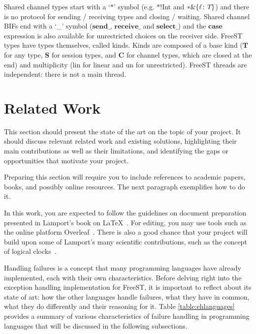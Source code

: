 \documentclass[sigplan]{acmart}
\newcommand{\un}{\text{un}}
\newcommand{\lin}{\text{lin}}
\newcommand{\mbf}[1]{\mathbf{#1}}
\newcommand{\send}{\mbf{send}}
\newcommand{\receive}{\mbf{receive}}
\newcommand{\select}{\mbf{select}}
\newcommand{\case}{\mbf{case}}
\newcommand{\Ckind}{\mbf{C}}
\newcommand{\Skind}{\mbf{S}}
\newcommand{\Tkind}{\mbf{T}}
\newcommand{\T}{\textit{\text{T}}}
\newcommand{\viewreceive}{\text{\&}}
\newcommand{\lbl}{\ell}
\begin{document}
Shared channel types start with a `$*$' symbol (e.g. $*$!Int and $*\viewreceive\{\lbl\!: \T\}$) and there is no protocol for sending / receiving types and closing / waiting.
Shared channel BIFs end with a `\_' symbol ($\send\_$, $\receive\_$ and $\select\_$) and the $\case$ expression is also available for unrestricted choices on the receiver side.
FreeST types have types themselves, called kinds.
Kinds are composed of a base kind ($\Tkind$ for any type, $\Skind$ for session types, and $\Ckind$ for channel types, which are closed at the end) and multiplicity ($\lin$ for linear and $\un$ for unrestricted).
FreeST threads are independent: there is not a main thread.

\section{Related Work} \label{sec:relatedwork}

\begin{template}
  This section should present the state of the art on the topic of your project. It should discuss relevant related work and existing solutions, highlighting their main contributions as well as their limitations, and identifying the gaps or opportunities that motivate your project.
  
  Preparing this section will require you to include references to academic papers, books, and possibly online resources. The next paragraph exemplifies how to do it.
  
  \medskip
  
  In this work, you are expected to follow the guidelines on document preparation presented in Lamport’s book on \LaTeX~\cite{lamport1994latex}. For editing, you may use tools such as the online platform Overleaf~\cite{overleaf}. There is also a good chance that your project will build upon some of Lamport’s many scientific contributions, such as the concept of logical clocks~\cite{lamport1978clocks}.
\end{template}

Handling failures is a concept that many programming languages have already implemented, each with their own characteristics.
Before delving right into the exception handling implementation for FreeST, it is important to reflect about its state of art: how the other languages handle failures, what they have in common, what they do differently and their reasoning for it.
Table \ref{table:ehlanguages} provides a summary of various characteristics of failure handling in programming languages that will be discussed in the following subsections.
\end{document}
